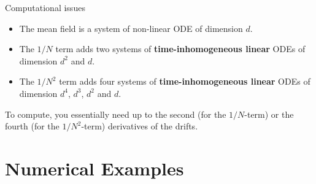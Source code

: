 \documentclass{beamer}
\begin{document}
\begin{frame}{Computational issues}
  \begin{itemize}
  \item The mean field is a system of non-linear ODE of dimension
    $d$. 
  \item The $1/N$ term adds two systems of \textbf{time-inhomogeneous
      linear} ODEs of dimension $d^2$ and $d$.
  \item The $1/N^2$ term adds four systems of
    \textbf{time-inhomogeneous linear} ODEs of dimension $d^4$, $d^3$,
    $d^2$ and $d$.
  \end{itemize}
  \bigskip
  
  To compute, you essentially need up to the second (for the
  $1/N$-term) or the fourth (for the $1/N^2$-term) derivatives of the
  drifts. 
\end{frame}

\section{Numerical Examples}
\end{document}
